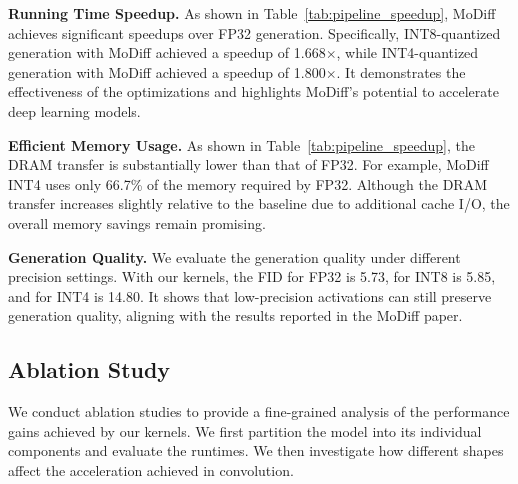 \textbf{Running Time Speedup.} As shown in Table~\ref{tab:pipeline_speedup}, MoDiff achieves significant speedups over FP32 generation. Specifically, INT8-quantized generation with MoDiff achieved a speedup of 1.668$\times$, while INT4-quantized generation with MoDiff achieved a speedup of 1.800$\times$. It demonstrates the effectiveness of the optimizations and highlights MoDiff's potential to accelerate deep learning models.



\textbf{Efficient Memory Usage.} As shown in Table~\ref{tab:pipeline_speedup}, the DRAM transfer is substantially lower than that of FP32. For example, MoDiff INT4 uses only 66.7\% of the memory required by FP32. Although the DRAM transfer increases slightly relative to the baseline due to additional cache I/O, the overall memory savings remain promising.

\textbf{Generation Quality.} 
We evaluate the generation quality under different precision settings. With our kernels, the FID for FP32 is 5.73, for INT8 is 5.85, and for INT4 is 14.80. It shows that low-precision activations can still preserve generation quality, aligning with the results reported in the MoDiff paper.


\subsection{Ablation Study}
We conduct ablation studies to provide a fine-grained analysis of the performance gains achieved by our kernels. We first partition the model into its individual components and evaluate the runtimes. We then investigate how different shapes affect the acceleration achieved in convolution.

